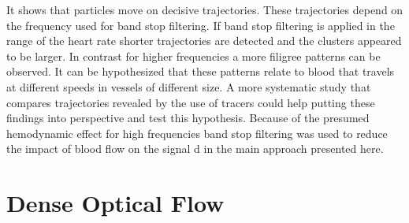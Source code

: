  It shows that particles move on decisive trajectories. These trajectories depend on the frequency used for band stop filtering. If band stop filtering is applied in the range of the heart rate shorter trajectories are detected and the clusters appeared to be larger. In contrast for higher frequencies a more filigree patterns can be observed. It can be hypothesized that these patterns relate to blood that travels at different speeds in vessels of different size. A more systematic study that compares trajectories revealed by the use of tracers could help putting these findings into perspective and test this hypothesis. Because of the presumed hemodynamic effect for high frequencies band stop filtering was used to reduce the impact of blood flow on the signal d in the main approach presented here.

\section{Dense Optical Flow}

